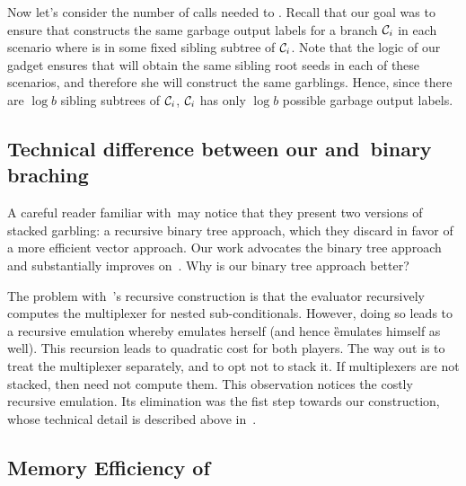 Now let’s consider the number of calls needed to \Ev.  Recall that our
goal was to ensure that \E constructs the same garbage output labels
for a branch $\mathcal C_i$ in each scenario where \aid is in some fixed
sibling subtree of $\mathcal C_i$. Note that the logic of our gadget ensures
that \E will obtain the same sibling root seeds in each of these
scenarios, and therefore she will construct the same garblings. Hence,
since there are $\log b$ sibling subtrees of $\mathcal C_i$, $\mathcal C_i$ has
only $\log b$ possible garbage output labels.


\subsection{Technical difference between our and~\HK binary braching}
\label{sec:techOverviewDiff}

A careful reader familiar with~\HK may notice that they present two versions of stacked garbling: a 
recursive binary tree approach, which they 
discard in favor of a more efficient vector approach.
Our work advocates the binary tree approach and substantially improves on~\HK.
Why is our binary tree approach better?

The problem with~\HK's recursive construction
is that the evaluator \E recursively computes the multiplexer for
nested sub-conditionals.
However, doing so leads to a recursive emulation whereby \E
emulates herself (and hence \G emulates himself as well).
This recursion leads to quadratic cost for both players.
The way out is to treat the multiplexer separately, and to opt not
to stack it.
If multiplexers are not stacked, then \E need not compute them.
This observation notices the costly recursive emulation.  Its elimination was the fist step towards our construction, whose technical detail is described above in~.





\subsection{Memory Efficiency of \ourschemelong}
\label{sec:memoryEfficiency}





